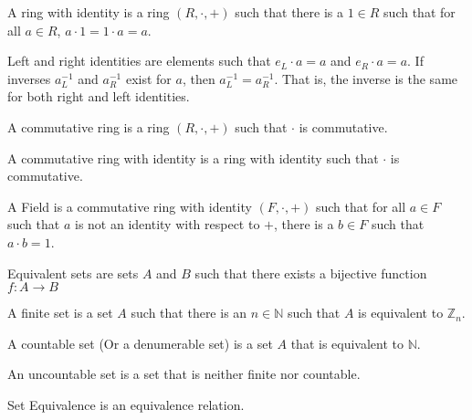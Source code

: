         \begin{definition}
            A ring with identity is a ring $(R,\cdot,+)$
            such that there is a ${1}\in{R}$ such that for
            all ${a}\in{R}$, ${a}\cdot{1}={1}\cdot{a}=a$.
        \end{definition}
        Left and right identities are elements such
        that ${e_{L}}\cdot{a}=a$ and ${e_{R}}\cdot{a}=a$.
        If inverses $a_{L}^{-1}$ and $a_{R}^{-1}$ exist
        for $a$, then $a_{L}^{-1}=a_{R}^{-1}$. That is,
        the inverse is the same for both right and left
        identities.
        \begin{definition}
            A commutative ring is a ring $(R,\cdot,+)$ such that
            $\cdot$ is commutative.
        \end{definition}
        \begin{definition}
            A commutative ring with identity is a
            ring with identity such that $\cdot$
            is commutative.
        \end{definition}
        \begin{definition}
            A Field is a commutative ring with identity
            $(F,\cdot,+)$
            such that for all ${a}\in{F}$ such that
            $a$ is not an identity with respect to $+$,
            there is a $b\in{F}$ such that ${a}\cdot{b}=1$.
        \end{definition}
        \begin{definition}
            Equivalent sets are sets $A$ and $B$ such that
            there exists a bijective function
            $f:{A}\rightarrow{B}$
        \end{definition}
        \begin{definition}
            A finite set is a set $A$ such that there
            is an ${n}\in{\mathbb{N}}$ such that $A$
            is equivalent to $\mathbb{Z}_{n}$.
        \end{definition}
        \begin{definition}
            A countable set (Or a denumerable set) is a
            set $A$ that is equivalent to $\mathbb{N}$.
        \end{definition}
        \begin{definition}
            An uncountable set is a set that is neither finite
            nor countable.
        \end{definition}
        \begin{theorem}
            Set Equivalence is an equivalence relation.
        \end{theorem}
